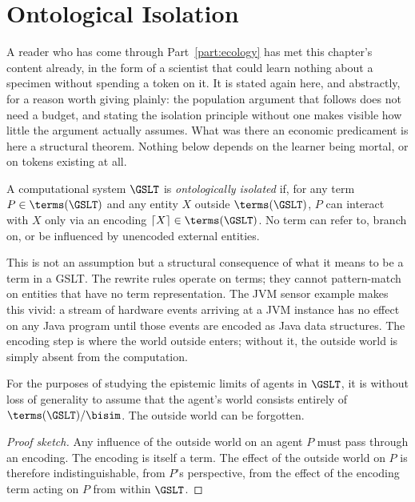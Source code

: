 \chapter{Ontological Isolation}
\label{sec:isolation}

A reader who has come through Part~\ref{part:ecology} has met this
chapter's content already, in the form of a scientist that could learn
nothing about a specimen without spending a token on it.
It is stated again here, and abstractly, for a reason worth giving
plainly: the population argument that follows does not need a budget, and
stating the isolation principle without one makes visible how little the
argument actually assumes.
What was there an economic predicament is here a structural theorem.
Nothing below depends on the learner being mortal, or on tokens existing
at all.

\bigskip

\begin{definition}
A computational system $\GSLT$ is \emph{ontologically isolated} if,
for any term $P \in \terms(\GSLT)$ and any entity $X$ outside
$\terms(\GSLT)$, $P$ can interact with $X$ only via an encoding
$\lceil X \rceil \in \terms(\GSLT)$.
No term can refer to, branch on, or be influenced by unencoded
external entities.
\end{definition}

\begin{remark}
This is not an assumption but a structural consequence of what it
means to be a term in a GSLT.
The rewrite rules operate on terms; they cannot pattern-match on
entities that have no term representation.
The JVM sensor example makes this vivid: a stream of hardware
events arriving at a JVM instance has no effect on any Java program
until those events are encoded as Java data structures.
The encoding step is where the world outside enters; without it,
the outside world is simply absent from the computation.
\end{remark}

\begin{proposition}
\label{prop:isolation-closure}
For the purposes of studying the epistemic limits of agents in $\GSLT$,
it is without loss of generality to assume that the agent's world
consists entirely of $\terms(\GSLT)/{\bisim}$.
The outside world can be forgotten.
\end{proposition}

\begin{proof}[Proof sketch]
Any influence of the outside world on an agent $P$ must pass through
an encoding.
The encoding is itself a term.
The effect of the outside world on $P$ is therefore indistinguishable,
from $P$'s perspective, from the effect of the encoding term acting
on $P$ from within $\GSLT$.
\end{proof}

